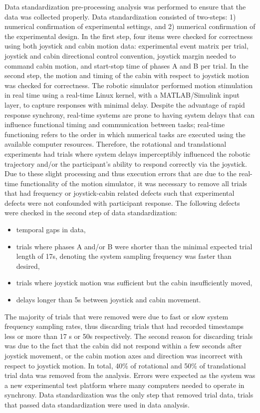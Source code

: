 \documentclass{ieeeaccess}
\begin{document}
\indent Data standardization pre-processing analysis was performed to ensure that the data was collected properly. Data standardization consisted of two-steps: 1) numerical confirmation of experimental settings, and 2) numerical confirmation of the experimental design. In the first step, four items were checked for correctness using both joystick and cabin motion data: experimental event matrix per trial, joystick and cabin directional control convention, joystick margin needed to command cabin motion, and start-stop time of phases A and B per trial. In the second step, the motion and timing of the cabin with respect to joystick motion was checked for correctness. The robotic simulator performed motion stimulation in real time using a real-time Linux kernel, with a MATLAB/Simulink input layer, to capture responses with minimal delay. Despite the advantage of rapid response synchrony, real-time systems are prone to having system delays that can influence functional timing and communication between tasks; real-time functioning refers to the order in which numerical tasks are executed using the available computer resources. Therefore, the rotational and translational experiments had trials where system delays imperceptibly influenced the robotic trajectory and/or the participant's ability to respond correctly via the joystick. Due to these slight processing and thus execution errors that are due to the real-time functionality of the motion simulator, it was necessary to remove all trials that had frequency or joystick-cabin related defects such that experimental defects were not confounded with participant response. The following defects were checked in the second step of data standardization:
\begin{itemize}
\item temporal gaps in data,
\item trials where phases A and/or B were shorter than the minimal expected trial length of 17s, denoting the system sampling frequency was faster than desired,
\item trials where joystick motion was sufficient but the cabin insufficiently moved,
\item delays longer than 5s between joystick and cabin movement.
\end{itemize}

\indent The majority of trials that were removed were due to fast or slow system frequency sampling rates, thus discarding trials that had recorded timestamps less or more than 17 s or 50s respectively. The second reason for discarding trials was due to the fact that the cabin did not respond within a few seconds after joystick movement, or the cabin motion axes and direction was incorrect with respect to joystick motion. In total, 40\% of rotational and 50\% of translational trial data was removed from the analysis. Errors were expected as the system was a new experimental test platform where many computers needed to operate in synchrony. Data standardization was the only step that removed trial data, trials that passed data standardization were used in data analysis.
\end{document}
